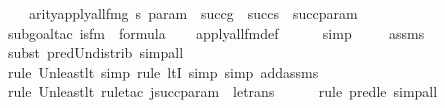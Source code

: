 \begin{isabellebody}
\ \ \ {\isachardoublequoteopen}arity{\isacharparenleft}{\kern0pt}apply{\isacharunderscore}{\kern0pt}all{\isacharunderscore}{\kern0pt}{}{\isacharunderscore}{\kern0pt}fm{\isacharparenleft}{\kern0pt}g{\isacharcomma}{\kern0pt}\ s{\isacharcomma}{\kern0pt}\ param{\isacharparenright}{\kern0pt}{\isacharparenright}{\kern0pt}\ {\isasymle}\ succ{\isacharparenleft}{\kern0pt}g{\isacharparenright}{\kern0pt}\ {\isasymunion}\ succ{\isacharparenleft}{\kern0pt}s{\isacharparenright}{\kern0pt}\ {\isasymunion}\ succ{\isacharparenleft}{\kern0pt}param{\isacharparenright}{\kern0pt}{\isachardoublequoteclose}\isanewline
%
\isadelimproof
\ \ %
\endisadelimproof
%
\isatagproof
{}\isamarkupfalse%
{\isacharparenleft}{\kern0pt}subgoal{\isacharunderscore}{\kern0pt}tac\ {\isachardoublequoteopen}is{\isacharunderscore}{\kern0pt}{}{\isacharunderscore}{\kern0pt}fm{\isacharparenleft}{\kern0pt}{}{\isacharparenright}{\kern0pt}\ {\isasymin}\ formula{\isachardoublequoteclose}{\isacharparenright}{\kern0pt}\isanewline
\ \ \isamarkupfalse%
\ apply{\isacharunderscore}{\kern0pt}all{\isacharunderscore}{\kern0pt}{}{\isacharunderscore}{\kern0pt}fm{\isacharunderscore}{\kern0pt}def\ \isanewline
\ \ \ \isamarkupfalse%
\ simp\ \isanewline
\ \ \isamarkupfalse%
\ assms\isanewline
\ \ \ \isamarkupfalse%
{\isacharparenleft}{\kern0pt}subst\ pred{\isacharunderscore}{\kern0pt}Un{\isacharunderscore}{\kern0pt}distrib{\isacharcomma}{\kern0pt}\ simp{\isacharunderscore}{\kern0pt}all{\isacharparenright}{\kern0pt}{\isacharplus}{\kern0pt}\isanewline
\ \ \ \isamarkupfalse%
{\isacharparenleft}{\kern0pt}rule\ Un{\isacharunderscore}{\kern0pt}least{\isacharunderscore}{\kern0pt}lt{\isacharcomma}{\kern0pt}\ simp{\isacharcomma}{\kern0pt}\ rule\ ltI{\isacharcomma}{\kern0pt}\ simp{\isacharcomma}{\kern0pt}\ simp\ add{\isacharcolon}{\kern0pt}assms{\isacharparenright}{\kern0pt}\isanewline
\ \ \ \isamarkupfalse%
{\isacharparenleft}{\kern0pt}rule\ Un{\isacharunderscore}{\kern0pt}least{\isacharunderscore}{\kern0pt}lt{\isacharcomma}{\kern0pt}\ rule{\isacharunderscore}{\kern0pt}tac\ j{\isacharequal}{\kern0pt}{\isachardoublequoteopen}succ{\isacharparenleft}{\kern0pt}param{\isacharparenright}{\kern0pt}{\isachardoublequoteclose}\ \ le{\isacharunderscore}{\kern0pt}trans{\isacharparenright}{\kern0pt}\isanewline
\ \ \ \ \ \isamarkupfalse%
{\isacharparenleft}{\kern0pt}rule\ pred{\isacharunderscore}{\kern0pt}le{\isacharcomma}{\kern0pt}\ simp{\isacharunderscore}{\kern0pt}all{\isacharparenright}{\kern0pt}{\isacharplus}{\kern0pt}\isanewline

\end{isabellebody}
